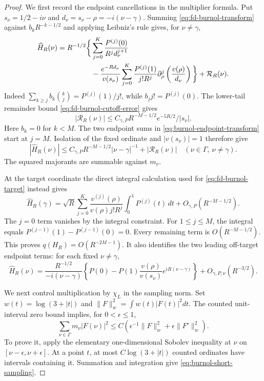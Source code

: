 \begin{proof}
We first record the endpoint cancellations in the
multiplier formula. Put $s_\nu=1/2-i\nu$ and
$d_\nu=s_\nu-\rho=-i(\nu-\gamma)$. Summing
\eqref{eq:fd-burnol-transform} against $b_kR^{-k-1/2}$
and applying Leibniz's rule gives, for $\nu\ne\gamma$,
\begin{align}
 \widehat H_R(\nu)
 =R^{-1/2}\bigg\{&
 \sum_{j=0}^K\frac{P^{(j)}(0)}{R^jd_\nu^{j+1}}\notag\\
 &-\frac{e^{-Rd_\nu}}{v(s_\nu)}
 \sum_{j=0}^K\frac{P^{(j)}(1)}{j!R^j}
       \partial_\rho^j\left(\frac{v(\rho)}{d_\nu}\right)
 \bigg\}+\mathcal R_R(\nu).
 \label{eq:burnol-endpoint-transform}
\end{align}
Indeed $\sum_{k\ge j}b_k\binom{k}{j}=P^{(j)}(1)/j!$,
while $b_jj!=P^{(j)}(0)$. The lower-tail remainder bound
\eqref{eq:fd-burnol-cutoff-error} gives
\begin{equation}\label{eq:burnol-poly-rem}
 |\mathcal R_R(\nu)|
 \le C_{\gamma,P}R^{-M-1/2}
           e^{-5R/2}/|s_\nu|.
\end{equation}
Here $b_k=0$ for $k<M$. The two endpoint sums in
\eqref{eq:burnol-endpoint-transform} start at $j=M$.
Isolation of the fixed ordinate and $|v(s_\nu)|=1$ therefore
give
\[
 |\widehat H_R(\nu)|
 \le C_{\gamma,P}R^{-M-1/2}|\nu-\gamma|^{-1}
      +|\mathcal R_R(\nu)|\quad(\nu\in\Gamma,\ \nu\ne\gamma).
\]
The squared majorants are summable against $m_\nu$.

At the target coordinate the direct integral calculation
used for \eqref{eq:fd-burnol-target} instead gives
\[
 \widehat H_R(\gamma)=
 \sqrt R\sum_{j=0}^K
 \frac{v^{(j)}(\rho)}{v(\rho)j!R^j}
             \int_0^1P^{(j)}(t)\,dt
          +O_{\gamma,P}(R^{-M-1/2}).
\]
The $j=0$ term vanishes by the integral constraint. For
$1\le j\le M$, the integral equals
$P^{(j-1)}(1)-P^{(j-1)}(0)=0$. Every remaining term is
$O(R^{-M-1/2})$. This proves $q(H_R)=O(R^{-2M-1})$.
It also identifies the two leading off-target endpoint terms:
for each fixed $\nu\ne\gamma$,
\[
 \widehat H_R(\nu)=
 \frac{R^{-1/2}}{-i(\nu-\gamma)}
 \left\{P(0)-P(1)\frac{v(\rho)}{v(s_\nu)}
                     e^{iR(\nu-\gamma)}\right\}
 +O_{\gamma,P,\nu}(R^{-3/2}).
\]

We next control multiplication by $\chi_L$ in the sampling
norm. Set $w(t)=\log(3+|t|)$ and
$\|F\|_w^2=\int w(t)|F(t)|^2dt$.
The counted unit-interval zero bound implies, for
$0<\epsilon\le1$,
\begin{equation}\label{eq:burnol-short-sampling}
 \sum_{\nu\in\Gamma}m_\nu|F(\nu)|^2
 \le C\left(\epsilon^{-1}\|F\|_w^2
                         +\epsilon\|F'\|_w^2\right).
\end{equation}
To prove it, apply the elementary one-dimensional Sobolev
inequality at $\nu$ on $[\nu-\epsilon,\nu+\epsilon]$.
At a point $t$, at most $C\log(3+|t|)$ counted ordinates
have intervals containing it. Summation and integration
give \eqref{eq:burnol-short-sampling}.


\end{proof}
